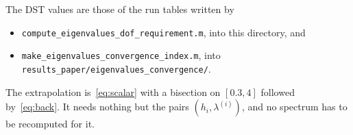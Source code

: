 \documentclass[11pt,a4paper]{article}
\begin{document}
The DST values are those of the run tables written by

\begin{itemize}
  \item \texttt{compute\_eigenvalues\_dof\_requirement.m},
        into this directory, and
  \item \texttt{make\_eigenvalues\_convergence\_index.m}, into\\
        \texttt{results\_paper/eigenvalues\_convergence/}.
\end{itemize}

The extrapolation is~\eqref{eq:scalar} with a bisection on $[0.3, 4]$ followed
by~\eqref{eq:back}. It needs nothing but the pairs $(h_i, \lambda^{(i)})$, and
no spectrum has to be recomputed for it.
\end{document}
